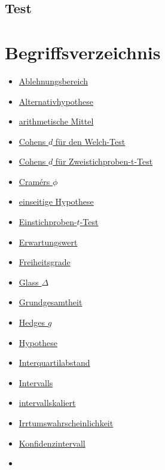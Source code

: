 \documentclass[
]{book}
\providecommand{\tightlist}{%
  \setlength{\itemsep}{0pt}\setlength{\parskip}{0pt}}
\theoremstyle{definition}
\theoremstyle{definition}
\theoremstyle{definition}
\theoremstyle{definition}
\theoremstyle{remark}
\begin{document}
\section{Test}\label{test-6}

\chapter*{Begriffsverzeichnis}\label{begriffsverzeichnis}

\begin{itemize}
\tightlist
\item
  \hyperref[customdef-ablehnungsbereich]{Ablehnungsbereich}
\item
  \hyperref[customdef-alternativhypothese]{Alternativhypothese}
\item
  \hyperref[customdef-arithmetisches-mittel]{arithmetische Mittel}
\item
  \hyperref[customdef-welch-cohens-d]{Cohens \(d\) für den Welch-Test}
\item
  \hyperref[customdef-cohens-d]{Cohens \(d\) für Zweistichproben-t-Test}
\item
  \hyperref[customdef-cramers-phi]{Cramérs \(\phi\)}
\item
  \hyperref[customdef-einseitige-hypothese]{einseitige Hypothese}
\item
  \hyperref[customdef-t-test]{Einstichproben-\(t\)-Test}
\item
  \hyperref[customdef-erwartungswert]{Erwartungswert}
\item
  \hyperref[customdef-freiheitsgrade]{Freiheitsgrade}
\item
  \hyperref[customdef-glass-delta]{Glass \(\Delta\)}
\item
  \hyperref[customdef-grundgesamtheit]{Grundgesamtheit}
\item
  \hyperref[customdef-hedges-g]{Hedges \(g\)}
\item
  \hyperref[customdef-hypothese]{Hypothese}
\item
  \hyperref[customdef-iqr]{Interquartilabstand}
\item
  \hyperref[customdef-interval]{Intervalls}
\item
  \hyperref[customdef-intervallskaliert]{intervallskaliert}
\item
  \hyperref[customdef-erring-level]{Irrtumswahrscheinlichkeit}
\item
  \hyperref[customdef-confidence-interval]{Konfidenzintervall}
\item

\end{itemize}
\end{document}
